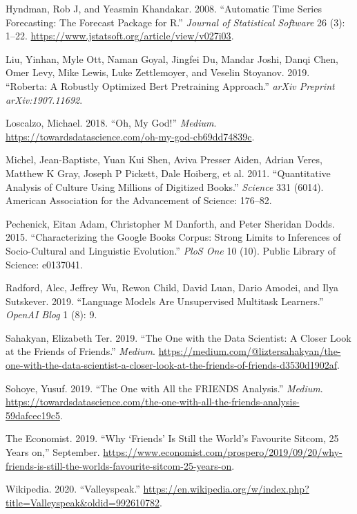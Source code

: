 \documentclass[]{article}
\begin{document}
\leavevmode\hypertarget{ref-forecast2}{}%
Hyndman, Rob J, and Yeasmin Khandakar. 2008. ``Automatic Time Series Forecasting: The Forecast Package for R.'' \emph{Journal of Statistical Software} 26 (3): 1--22. \url{https://www.jstatsoft.org/article/view/v027i03}.

\leavevmode\hypertarget{ref-liu2019roberta}{}%
Liu, Yinhan, Myle Ott, Naman Goyal, Jingfei Du, Mandar Joshi, Danqi Chen, Omer Levy, Mike Lewis, Luke Zettlemoyer, and Veselin Stoyanov. 2019. ``Roberta: A Robustly Optimized Bert Pretraining Approach.'' \emph{arXiv Preprint arXiv:1907.11692}.

\leavevmode\hypertarget{ref-loscalzo_2018}{}%
Loscalzo, Michael. 2018. ``Oh, My God!'' \emph{Medium}. \url{https://towardsdatascience.com/oh-my-god-cb69dd74839c}.

\leavevmode\hypertarget{ref-michel2011quantitative}{}%
Michel, Jean-Baptiste, Yuan Kui Shen, Aviva Presser Aiden, Adrian Veres, Matthew K Gray, Joseph P Pickett, Dale Hoiberg, et al. 2011. ``Quantitative Analysis of Culture Using Millions of Digitized Books.'' \emph{Science} 331 (6014). American Association for the Advancement of Science: 176--82.

\leavevmode\hypertarget{ref-pechenick2015characterizing}{}%
Pechenick, Eitan Adam, Christopher M Danforth, and Peter Sheridan Dodds. 2015. ``Characterizing the Google Books Corpus: Strong Limits to Inferences of Socio-Cultural and Linguistic Evolution.'' \emph{PloS One} 10 (10). Public Library of Science: e0137041.

\leavevmode\hypertarget{ref-radford2019language}{}%
Radford, Alec, Jeffrey Wu, Rewon Child, David Luan, Dario Amodei, and Ilya Sutskever. 2019. ``Language Models Are Unsupervised Multitask Learners.'' \emph{OpenAI Blog} 1 (8): 9.

\leavevmode\hypertarget{ref-sahakyan_one_2019}{}%
Sahakyan, Elizabeth Ter. 2019. ``The One with the Data Scientist: A Closer Look at the Friends of Friends.'' \emph{Medium}. \url{https://medium.com/@liztersahakyan/the-one-with-the-data-scientist-a-closer-look-at-the-friends-of-friends-d3530d1902af}.

\leavevmode\hypertarget{ref-sohoye_one_2019}{}%
Sohoye, Yusuf. 2019. ``The One with All the FRIENDS Analysis.'' \emph{Medium}. \url{https://towardsdatascience.com/the-one-with-all-the-friends-analysis-59dafcec19c5}.

\leavevmode\hypertarget{ref-TheEconomist_2019}{}%
The Economist. 2019. ``Why `Friends' Is Still the World's Favourite Sitcom, 25 Years on,'' September. \url{https://www.economist.com/prospero/2019/09/20/why-friends-is-still-the-worlds-favourite-sitcom-25-years-on}.

\leavevmode\hypertarget{ref-noauthor_valleyspeak_2020}{}%
Wikipedia. 2020. ``Valleyspeak.'' \url{https://en.wikipedia.org/w/index.php?title=Valleyspeak\&oldid=992610782}.
\end{document}
